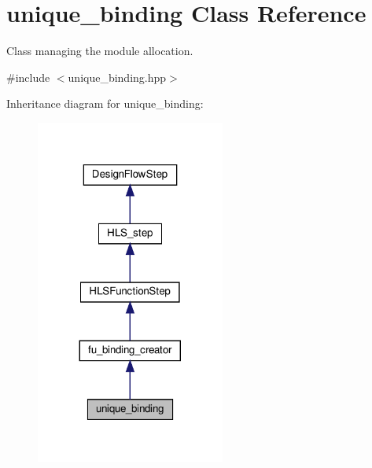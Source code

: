 \hypertarget{classunique__binding}{}\section{unique\+\_\+binding Class Reference}
\label{classunique__binding}


Class managing the module allocation.  




{\ttfamily \#include $<$unique\+\_\+binding.\+hpp$>$}



Inheritance diagram for unique\+\_\+binding\+:
\nopagebreak
\begin{figure}[H]
\begin{center}
\leavevmode
\includegraphics[width=176pt]{dc/dc5/classunique__binding__inherit__graph}
\end{center}
\end{figure}


